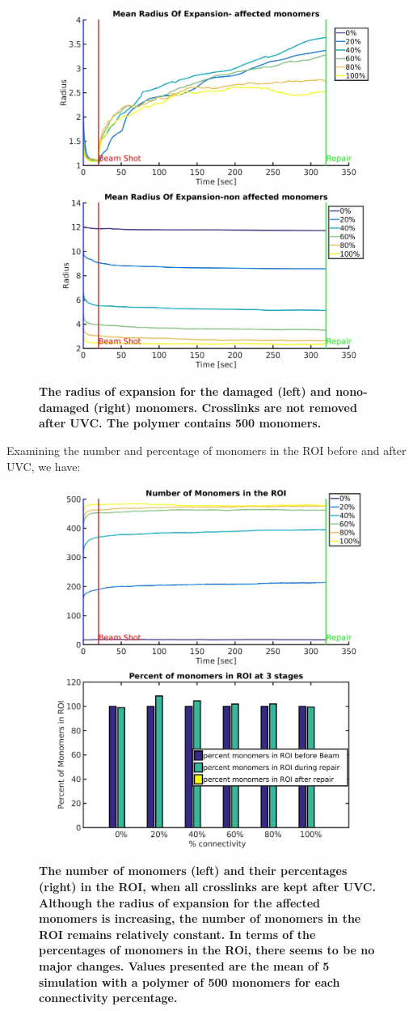 \documentclass[12pt]{report}
\begin{document}
		\begin{figure}[H]
		\includegraphics[width=0.5\linewidth, height=0.3\textheight]{Images/expandAffected/NoCrosslinksBroken/meanRadiusOfExpansionAffected}
		\includegraphics[width=0.5\linewidth, height=0.3\textheight]{Images/expandAffected/NoCrosslinksBroken/meanRadiusOfExpansionNonAffected}
		\caption{\tiny{\textbf{The radius of expansion for the damaged (left) and nono-damaged (right) monomers. Crosslinks are not removed after UVC. The polymer contains 500 monomers.}}}
		\label{fig:meanRadiusOfExpansionAffectedNoCrosslinksBroken}
		\end{figure}
			      
		 Examining the number and percentage of monomers in the ROI before and after UVC, we have:
		 		      
		\begin{figure}[H]
		\includegraphics[width=0.5\linewidth, height=0.3\textheight]{Images/expandAffected/NoCrosslinksBroken/meanNumMonomersInROI}
		\includegraphics[width=0.5\linewidth, height=0.3\textheight]{Images/expandAffected/NoCrosslinksBroken/percentOfMonomersInROI}
		\caption{\tiny{\textbf{The number of monomers (left) and their percentages (right) in the ROI, when all crosslinks are kept after UVC. Although the radius of expansion for the affected monomers is increasing, the number of monomers in the ROI remains relatively constant. In terms of the percentages of monomers in the ROi, there seems to be no major changes. Values presented are the mean of 5 simulation with a polymer of 500 monomers for each connectivity percentage.}}}
		\label{fig:meanNumMonomersInROINoCrosslinkBroken}
		\end{figure}
		
\end{document}

